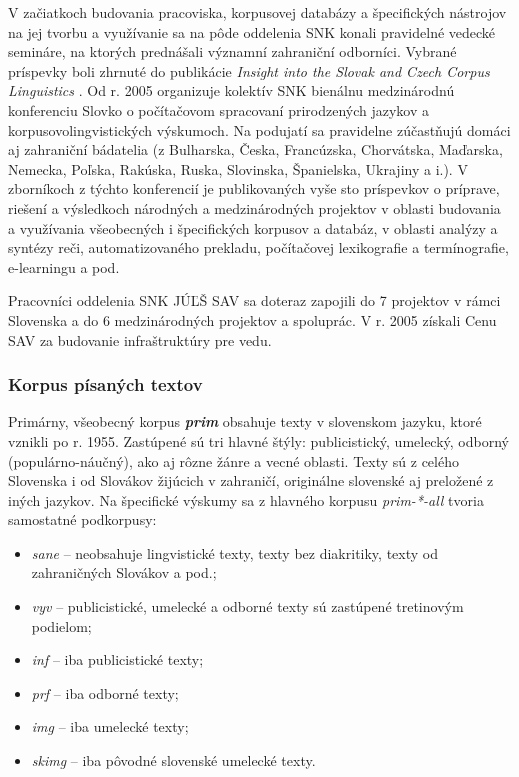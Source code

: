 \begin{multicols}{2}
V začiatkoch budovania pracoviska, korpusovej databázy a
špecifických nástrojov na jej tvorbu a využívanie sa na pôde
oddelenia SNK konali pravidelné vedecké semináre, na ktorých
prednášali významní zahraniční odborníci. Vybrané príspevky
boli zhrnuté do publikácie \emph{Insight into the Slovak and Czech Corpus Linguistics} \cite{simkova2006a}. Od r. 2005 organizuje kolektív SNK bienálnu medzinárodnú konferenciu
Slovko\cite{f10} o
počítačovom spracovaní prirodzených jazykov a
korpusovolingvistických výskumoch. Na podujatí sa pravidelne
zúčastňujú domáci aj zahraniční bádatelia (z Bulharska, Česka,
Francúzska, Chorvátska, Maďarska, Nemecka, Poľska, Rakúska, Ruska,
Slovinska, Španielska, Ukrajiny a i.). V zborníkoch z týchto
konferencií je publikovaných vyše sto príspevkov o príprave,
riešení a výsledkoch národných a medzinárodných projektov v
oblasti budovania a využívania všeobecných i špecifických korpusov
a databáz, v oblasti analýzy a syntézy reči, automatizovaného
prekladu, počítačovej lexikografie a termínografie, e-learningu a
pod. 

Pracovníci oddelenia SNK JÚĽŠ SAV sa doteraz zapojili do 7
projektov v rámci Slovenska a do 6 medzinárodných projektov a
spoluprác\cite{f11}. V r. 2005
získali Cenu SAV za budovanie infraštruktúry pre vedu. 

\subsubsection{Korpus písaných textov}
Primárny, všeobecný korpus {\bf\emph{prim}} obsahuje texty
v slovenskom jazyku, ktoré vznikli po r. 1955.  Zastúpené sú tri
hlavné štýly: publicistický, umelecký, odborný
(populárno-náučný), ako aj rôzne žánre a vecné oblasti. Texty
sú z celého Slovenska i od Slovákov žijúcich v zahraničí,
originálne slovenské aj preložené z iných jazykov. Na špecifické
výskumy sa z hlavného korpusu \emph{prim-*-all} tvoria samostatné
podkorpusy:

\begin{itemize}
\item \emph{sane} – neobsahuje lingvistické texty, texty bez diakritiky, texty od zahraničných Slovákov a pod.;
\item \emph{vyv} – publicistické, umelecké a odborné texty sú zastúpené tretinovým podielom;
\item \emph{inf} – iba publicistické texty;
\item \emph{prf} – iba odborné texty;
\item \emph{img} – iba umelecké texty;
\item \emph{skimg} – iba pôvodné slovenské umelecké texty.
\end{itemize}


\end{multicols}
